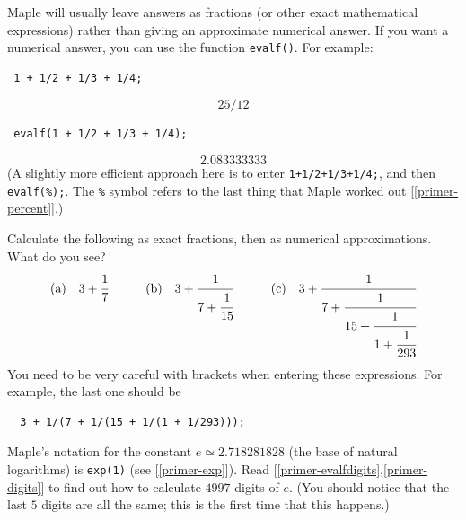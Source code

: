 \documentclass[a4paper,10pt]{amsbook}
\begin{document}
Maple will usually leave answers as fractions (or other exact
mathematical expressions) rather than giving an approximate numerical
answer.  If you want a numerical answer, you can use the function
\verb~evalf()~.  For example:
\begin{verbatim}
 1 + 1/2 + 1/3 + 1/4;
\end{verbatim}
\[ 25/12 \]
\begin{verbatim}
 evalf(1 + 1/2 + 1/3 + 1/4);
\end{verbatim}
\[ 2.083333333 \]
(A slightly more efficient approach here is to enter
\verb~1+1/2+1/3+1/4;~, and then \verb~evalf(%);~.  The
\verb~%~ symbol refers to the last thing that Maple worked
out [\ref{primer-percent}].) 

\begin{exercise}\label{ex-cfrac-pi}
 Calculate the following as exact fractions, then as numerical
 approximations.  What do you see? 
 \[ \text{(a)}\hspace{1em}
     3+\cfrac{1}{7}
    \hspace{3em}
    \text{(b)}\hspace{1em}
     3+\cfrac{1}{7 + \cfrac{1}{15}}
    \hspace{3em}
    \text{(c)}\hspace{1em}
     3+\cfrac{1}{7 + \cfrac{1}{15 + \cfrac{1}{1 + \cfrac{1}{293}}}}  
  \]
  You need to be very careful with brackets when entering these
  expressions.  For example, the last one should be
\begin{verbatim}
  3 + 1/(7 + 1/(15 + 1/(1 + 1/293)));
\end{verbatim}
\end{exercise}

\begin{exercise}\label{ex-e-digits}
 Maple's notation for the constant $e\simeq 2.718281828$ (the base of
 natural logarithms) is \verb~exp(1)~  (see
 [\ref{primer-exp}]).  Read [\ref{primer-evalfdigits},\ref{primer-digits}] 
 to find out how to calculate $4997$ digits of $e$.  (You should notice
 that the last $5$ digits are all the same; this is the first time
 that this happens.) 
\end{exercise}
\end{document}
